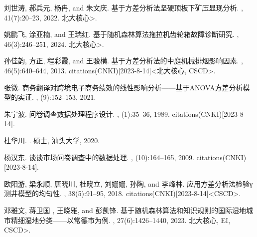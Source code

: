 \documentclass{cumcmthesis}
\begin{document}
\clearpage
\begin{thebibliography}{99}%
刘世涛,  郝兵元,  杨冉, and  朱文庆.
\newblock 基于方差分析法坚硬顶板下矿压显现分析.
, 41(7):20--23, 2022.
\newblock {\textless}北大核心{\textgreater}.

 姚鹏飞,  涂亚楠, and  王瑞红.
\newblock 基于随机森林算法拖拉机齿轮箱故障诊断研究.
, 46(3):246--251, 2024.
\newblock {\textless}北大核心{\textgreater}.

 孙佳韵,  方正,  程彩霞, and  王骏横.
\newblock 基于方差分析法的中庭机械排烟影响因素.
, 46(5):640--644, 2013.
 citations(CNKI)[2023-8-14]{\textless}北大核心,
  CSCD{\textgreater}.

 张微.
\newblock
  商务翻译对跨境电子商务绩效的线性影响分析——基于{ANOVA方差分析模型的实证}.
, (9):152--153, 2021.

 朱宁波.
\newblock 问卷调查数据处理程序设计.
, (1):35--36, 1989.
 citations(CNKI)[2023-8-14].

 杜华川.
.
\newblock 硕士, 汕头大学, 2020.

 杨汉东.
\newblock 谈谈市场问卷调查中的数据处理.
, (10):164--165, 2009.
 citations(CNKI)[2023-8-14].

 欧阳游,  梁永顺,  唐晓川,  杜晓立,  刘姗姗,  孙陶, and 
  李峰林.
\newblock 应用方差分析法检验γ测井模型的均匀性.
, 38(5):91--95, 2018.
 citations(CNKI)[2023-8-14]{\textless}CSCD{\textgreater}.

 邓雅文, 蒋卫国 ,  王晓雅, and  彭凯锋.
\newblock
  基于随机森林算法和知识规则的国际湿地城市精细湿地分类——以常德市为例.
, 27(6):1426--1440, 2023.
\newblock {\textless}北大核心, EI, CSCD{\textgreater}.
\end{thebibliography}
\end{document}
